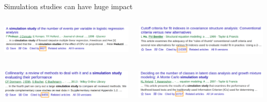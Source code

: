\documentclass[english, 12pt, aspectratio=169]{beamer}
\begin{document}
\begin{frame}{Simulation studies can have huge impact}



    \begin{block}{}
          \begin{columns}
      \begin{column}{0.5\textwidth}
        \centering
        \includegraphics[width=1.05\textwidth,frame]{pics/peduzzi.png}
      \end{column}
      \begin{column}{0.5\textwidth}
        \centering
        \includegraphics[width=1.05\textwidth,frame]{pics/hubentler.png}

      \end{column}
      \end{columns}
    \end{block}

      \begin{block}{}
          \begin{columns}
      \begin{column}{0.5\textwidth}
        \centering
        \includegraphics[width=1.05\textwidth,frame]{pics/dormann.png}
      \end{column}
      \begin{column}{0.5\textwidth}
        \centering
        \includegraphics[width=1.05\textwidth,frame]{pics/nylund.png}


\end{column}
\end{columns}
\end{block}
\end{frame}
\end{document}
